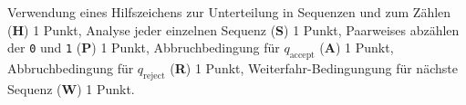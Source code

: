 \begin{bewertung}
Verwendung eines Hilfszeichens zur Unterteilung in Sequenzen
und zum Zählen ({\bf H}) 1 Punkt,
Analyse jeder einzelnen Sequenz ({\bf S}) 1 Punkt,
Paarweises abzählen der {\tt 0} und {\tt 1} ({\bf P}) 1 Punkt,
Abbruchbedingung für $q_{\text{accept}}$ ({\bf A}) 1 Punkt,
Abbruchbedingung für $q_{\text{reject}}$ ({\bf R}) 1 Punkt,
Weiterfahr-Bedingungung für nächste Sequenz ({\bf W}) 1 Punkt.
\end{bewertung}


